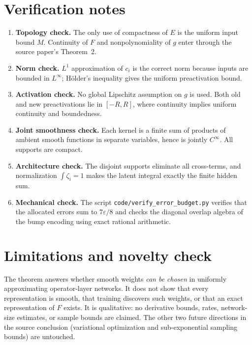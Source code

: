 \documentclass[11pt]{article}
\begin{document}
\section{Verification notes}

\begin{enumerate}
\item \textbf{Topology check.}  The only use of compactness of $E$ is the
uniform input bound $M$.  Continuity of $F$ and nonpolynomiality of $g$ enter
through the source paper's Theorem~2.
\item \textbf{Norm check.}  $L^1$ approximation of $c_i$ is the correct norm
because inputs are bounded in $L^\infty$; H\"older's inequality gives the
uniform preactivation bound.
\item \textbf{Activation check.}  No global Lipschitz assumption on $g$ is
used.  Both old and new preactivations lie in $[-R,R]$, where continuity
implies uniform continuity and boundedness.
\item \textbf{Joint smoothness check.}  Each kernel is a finite sum of
products of ambient smooth functions in separate variables, hence is jointly
$C^\infty$.  All supports are compact.
\item \textbf{Architecture check.}  The disjoint supports eliminate all
cross-terms, and normalization $\int\zeta_i=1$ makes the latent integral
exactly the finite hidden sum.
\item \textbf{Mechanical check.}  The script
\texttt{code/verify\_error\_budget.py} verifies that the allocated errors sum
to $7\varepsilon/8$ and checks the diagonal overlap algebra of the bump
encoding using exact rational arithmetic.
\end{enumerate}

\section{Limitations and novelty check}

The theorem answers whether smooth weights \emph{can be chosen} in uniformly
approximating operator-layer networks.  It does not show that every
representation is smooth, that training discovers such weights, or that an
exact representation of $F$ exists.  It is qualitative: no derivative bounds,
rates, network-size estimates, or sample bounds are claimed.  The other two
future directions in the source conclusion (variational optimization and
sub-exponential sampling bounds) are untouched.
\end{document}
